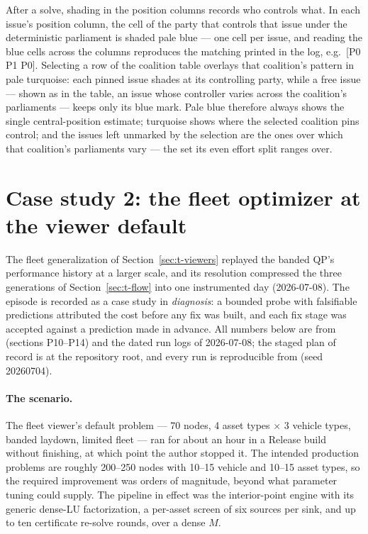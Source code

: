 After a solve, shading in the position columns records who controls
what. In each issue's position column, the cell of the party that
controls that issue under the deterministic parliament is shaded pale
blue --- one cell per issue, and reading the blue cells across the
columns reproduces the matching printed in the log, e.g.\ [P0 P1 P0].
Selecting a row of the coalition table overlays that coalition's pattern
in pale turquoise: each pinned issue shades at its controlling party,
while a free issue --- shown as \code{*} in the table, an issue whose
controller varies across the coalition's parliaments --- keeps only its
blue mark. Pale blue therefore always shows the single central-position
estimate; turquoise shows where the selected coalition pins control; and
the issues left unmarked by the selection are the ones over which that
coalition's parliaments vary --- the set its even effort split ranges
over.

\section{Case study 2: the fleet optimizer at the viewer default}
\label{sec:t-fleet}

The fleet generalization of Section~\ref{sec:t-viewers} replayed the banded
QP's performance history at a larger scale, and its resolution compressed
the three generations of Section~\ref{sec:t-flow} into one instrumented
day (2026-07-08). The episode is recorded as a case study in
\emph{diagnosis}: a bounded probe with falsifiable predictions attributed
the cost before any fix was built, and each fix stage was accepted against
a prediction made in advance. All numbers below are from
 (sections P10--P14) and the dated run
logs of 2026-07-08; the staged plan of record is
 at the repository root, and
every run is reproducible from  (seed 20260704).

\paragraph{The scenario.} The fleet viewer's default problem --- 70 nodes,
4 asset types $\times$ 3 vehicle types, banded laydown, limited fleet ---
ran for about an hour in a Release build without finishing, at which point
the author stopped it. The intended production problems are roughly
200--250 nodes with 10--15 vehicle and 10--15 asset types, so the required
improvement was orders of magnitude, beyond what parameter tuning could
supply. The pipeline in effect was the interior-point engine with its
generic dense-LU factorization, a per-asset screen of six sources per
sink, and up to ten certificate re-solve rounds, over a dense $M$.

